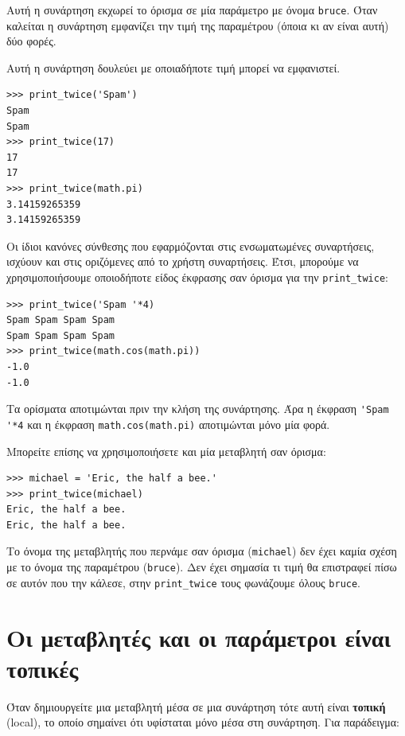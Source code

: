 \documentclass[10pt]{book}
\begin{document}
Αυτή η συνάρτηση εκχωρεί το όρισμα σε μία παράμετρο με όνομα {\tt bruce}.
Όταν καλείται η συνάρτηση εμφανίζει την τιμή της παραμέτρου (όποια κι αν είναι αυτή) δύο φορές.

Αυτή η συνάρτηση δουλεύει με οποιαδήποτε τιμή μπορεί να εμφανιστεί.


\begin{verbatim}
>>> print_twice('Spam')
Spam
Spam
>>> print_twice(17)
17
17
>>> print_twice(math.pi)
3.14159265359
3.14159265359
\end{verbatim}
%

Οι ίδιοι κανόνες σύνθεσης που εφαρμόζονται στις ενσωματωμένες συναρτήσεις,
ισχύουν και στις οριζόμενες από το χρήστη συναρτήσεις. Έτσι, μπορούμε να χρησιμοποιήσουμε οποιοδήποτε είδος έκφρασης σαν όρισμα για την \verb"print_twice":

\begin{verbatim}
>>> print_twice('Spam '*4)
Spam Spam Spam Spam
Spam Spam Spam Spam
>>> print_twice(math.cos(math.pi))
-1.0
-1.0
\end{verbatim}
%

Τα ορίσματα αποτιμώνται πριν την κλήση της συνάρτησης. Άρα η έκφραση 
\verb"'Spam '*4" και η έκφραση {\tt math.cos(math.pi)} αποτιμώνται μόνο μία φορά.

Μπορείτε επίσης να χρησιμοποιήσετε και μία μεταβλητή σαν όρισμα:


\begin{verbatim}
>>> michael = 'Eric, the half a bee.'
>>> print_twice(michael)
Eric, the half a bee.
Eric, the half a bee.
\end{verbatim}
%

Το όνομα της μεταβλητής που περνάμε σαν όρισμα ({\tt michael}) 
δεν έχει καμία σχέση με το όνομα της παραμέτρου ({\tt bruce}). 
Δεν έχει σημασία τι τιμή θα επιστραφεί πίσω σε αυτόν που την κάλεσε,
στην \verb"print_twice" τους φωνάζουμε όλους {\tt bruce}.



\section{Οι μεταβλητές και οι παράμετροι είναι τοπικές}

Όταν δημιουργείτε μια μεταβλητή μέσα σε μια συνάρτηση τότε αυτή είναι {\bf τοπική} (local), το οποίο σημαίνει ότι υφίσταται μόνο μέσα στη συνάρτηση. Για παράδειγμα:
\end{document}
